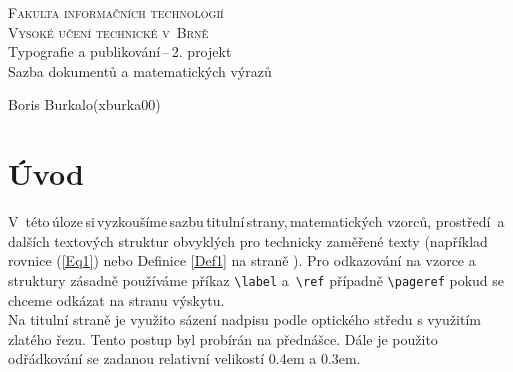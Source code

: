 \documentclass[a4paper, twocolumn, 11pt]{article}
\begin{document}
\begin{titlepage}
\begin{center}
\Huge\textsc{Fakulta informačních technologií\\
Vysoké učení technické v~Brně}\\
\LARGE{Typografie a publikování\,--\,2. projekt}\\
Sazba dokumentů a matematických výrazů\\
\end{center}
{\Large \the\year \hfill Boris Burkalo(xburka00)}
\end{titlepage}


\section*{Úvod}\label{1}
V~této\,úloze\,si\,vyzkoušíme\,sazbu\,titulní\,strany,\,matematic\-kých vzorců, prostředí~a dalších textových struktur obvyklých pro technicky zaměřené texty (například rovnice (\ref{Eq1}) nebo Definice \ref{Def1} na straně \pageref{1}). Pro odkazování na vzorce a struktury zásadně používáme příkaz \verb=\label= a~\verb=\ref= případně \verb=\pageref= pokud se chceme odkázat na stranu výskytu. \\
\indent
Na titulní straně je využito sázení nadpisu podle optického středu s využitím zlatého řezu. Tento postup byl probírán na přednášce. Dále je použito odřádkování se zadanou relativní velikostí 0.4em a 0.3em.
\end{document}
